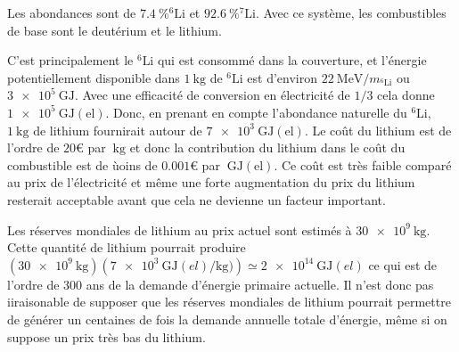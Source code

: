 \documentclass[main.tex]{subfiles}
\begin{document}
Les abondances sont de \( \SI{7.4}{\percent} {}^6\text{Li} \) et \( \SI{92.6}{\percent} {}^7\text{Li} \).
Avec ce système, les combustibles de base sont le deutérium et le lithium.

C'est principalement le \( ^6\text{Li} \) qui est consommé dans la couverture, et l'énergie potentiellement disponible dans \( \SI{1}{\kilogram} \) de \( ^6\text{Li} \) est d'environ \( \SI{22}{\mega\electronvolt} / m_{^6\text{Li}} \) ou \( \SI{3e5}{\giga\joule} \).
Avec une efficacité de conversion en électricité de \( 1/3 \) cela donne \( \SI{1e5}{\giga\joule}(\text{el}) \).
Donc, en prenant en compte l'abondance naturelle du \( ^6\text{Li} \), \( \SI{1}{\kilogram} \) de lithium fournirait autour de \( \SI{7e3}{\giga\joule}(\text{el}) \).
Le coût du lithium est de l'ordre de \( 20\text{€} \) par \( \SI{}{\kilogram} \) et donc la contribution du lithium dans le coût du combustible est de ùoins de \( 0.001\text{€} \) par \( \SI{}{\giga\joule}(\text{el}) \).
Ce coût est très faible comparé au prix de l'électricité et même une forte augmentation du prix du lithium resterait acceptable avant que cela ne devienne un facteur important.

Les réserves mondiales de lithium au prix actuel sont estimés à \( \SI{30e9}{\kilogram} \).
Cette quantité de lithium pourrait produire \( \left( \SI{30e9}{\kilogram} \right) \left( \SI{7e3}{\giga\joule (el)\per\kilogram)} \right) \simeq \SI{2e14}{\giga\joule (el)} \) ce qui est de l'ordre de \( 300 \) ans de la demande d'énergie primaire actuelle.
Il n'est donc pas iiraisonable de supposer que les réserves mondiales de lithium pourrait permettre de générer un centaines de fois la demande annuelle totale d'énergie, même si on suppose un prix très bas du lithium.
\end{document}
